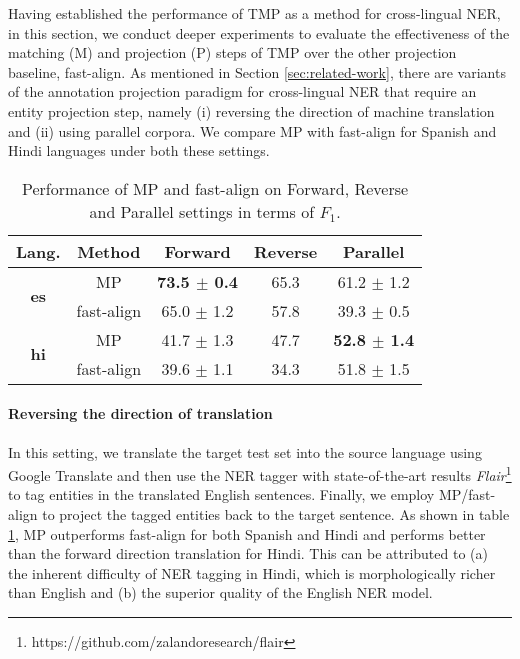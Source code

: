 \documentclass[11pt,a4paper]{article}
\begin{document}
Having established the performance of TMP 
as a method for cross-lingual NER,
in this section, we conduct deeper experiments 
to evaluate the effectiveness of the matching (M) and projection (P) steps of TMP over the other projection baseline, fast-align. 
As mentioned in Section \ref{sec:related-work}, 
there are variants of the annotation projection paradigm for cross-lingual NER 
that require an entity projection step, namely 
(i) reversing the direction of machine translation and 
(ii) using parallel corpora. 
We compare MP with fast-align for Spanish and Hindi languages under both these settings.

\begin{table}[htb]
\small
\centering
\begin{tabularx}{220pt}{ccccc}
\toprule
\bf Lang. & \bf Method & \bf Forward & \bf Reverse & \bf Parallel \\
\midrule
\multirow{2}{*}{\bf es} & MP & \bf 73.5 $\pm$ 0.4 & 65.3 & 61.2 $\pm$ 1.2 \\
 & fast-align & 65.0 $\pm$ 1.2 & 57.8 & 39.3 $\pm$ 0.5 \\
\midrule
\multirow{2}{*}{\bf hi} & MP & 41.7 $\pm$ 1.3 & 47.7 & \bf 52.8 $\pm$ 1.4 \\
& fast-align & 39.6 $\pm$ 1.1 & 34.3 & 51.8 $\pm$ 1.5 \\
\bottomrule
\end{tabularx}
\caption{Performance of MP and fast-align on Forward, Reverse and Parallel settings in terms of $F_1$.}
\label{tab:analysis_paradigms}
\end{table}



\paragraph{Reversing the direction of translation} 
In this setting, we translate the target test set 
into the source language using Google Translate 
and then use the NER tagger with state-of-the-art results \textit{Flair}\footnote{https://github.com/zalandoresearch/flair} 
to tag entities in the translated English sentences.
Finally, we employ MP/fast-align to project the tagged entities back to the target sentence. 
As shown in table \ref{tab:analysis_paradigms}, 
MP outperforms fast-align for both Spanish and Hindi 
and performs better than the forward direction translation for Hindi. 
This can be attributed to 
(a) the inherent difficulty of NER tagging in Hindi,
which is morphologically richer than English and 
(b) the superior quality of the English NER model.
\end{document}
